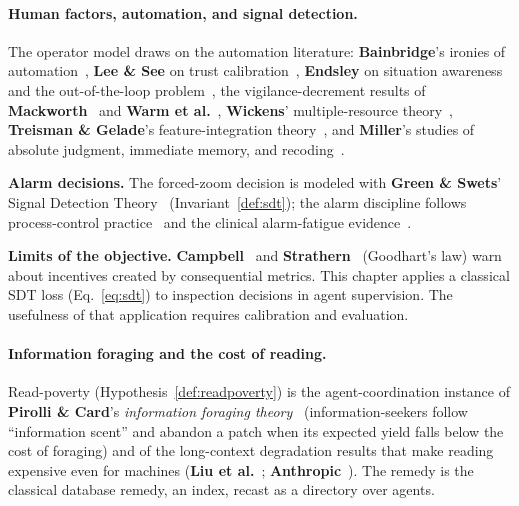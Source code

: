 \documentclass[11pt,a4paper]{article}
\theoremstyle{definition}
\theoremstyle{plain}
\begin{document}
\paragraph{Human factors, automation, and signal detection.}
The operator model draws on the automation literature:
\textbf{Bainbridge}'s ironies of automation~,
\textbf{Lee \& See} on trust calibration~,
\textbf{Endsley} on situation awareness and the out-of-the-loop
problem~, the vigilance-decrement results of
\textbf{Mackworth}~ and \textbf{Warm et al.}~,
\textbf{Wickens}' multiple-resource theory~,
\textbf{Treisman \& Gelade}'s feature-integration theory~, and
\textbf{Miller}'s studies of absolute judgment, immediate memory, and
recoding~.

\noindent\textbf{Alarm decisions.} The forced-zoom decision is
modeled with \textbf{Green \& Swets}' Signal Detection Theory~
(Invariant~\ref{def:sdt}); the alarm discipline follows process-control
practice~ and the clinical alarm-fatigue evidence~.

\noindent\textbf{Limits of the objective.}
\textbf{Campbell}~ and \textbf{Strathern}~
(Goodhart's law) warn about incentives created by consequential metrics. This
chapter applies a classical SDT loss (Eq.~\ref{eq:sdt}) to inspection decisions
in agent supervision. The usefulness of that application requires calibration
and evaluation.

\paragraph{Information foraging and the cost of reading.}
Read-poverty (Hypothesis~\ref{def:readpoverty}) is the agent-coordination instance of
\textbf{Pirolli \& Card}'s \emph{information foraging theory}~
(information-seekers follow ``information scent'' and abandon a patch when its expected
yield falls below the cost of foraging) and of the long-context degradation
results that make reading expensive even for machines (\textbf{Liu et
al.}~; \textbf{Anthropic}~). The remedy is the
classical database remedy, an index, recast as a directory over agents.
\end{document}
